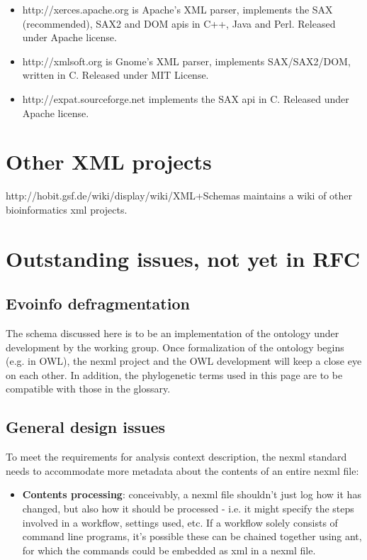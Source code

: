 \documentclass{article}
\begin{document}
\begin{itemize}

\item http://xerces.apache.org is Apache's XML parser, implements the SAX (recommended), SAX2 and DOM apis in C++, Java and Perl. 
Released under Apache license.

\item http://xmlsoft.org is Gnome's XML parser, implements SAX/SAX2/DOM, written in C. Released under MIT License.

\item http://expat.sourceforge.net implements the SAX api in C. Released under Apache license.

\end{itemize}

\section{Other XML projects}
http://hobit.gsf.de/wiki/display/wiki/XML+Schemas maintains a wiki of other bioinformatics xml projects.

\section{Outstanding issues, not yet in RFC}

\subsection{Evoinfo defragmentation}
The schema discussed here is to be an implementation of the ontology under development by the working group. 
Once formalization of the ontology begins (e.g. in OWL), the nexml project and the OWL development will keep a close eye on each 
other. In addition, the phylogenetic terms used in this page are to be compatible with those in the glossary.

\subsection{General design issues}
To meet the requirements for analysis context description, the nexml standard needs to accommodate more metadata 
about the contents of an entire nexml file:

\begin{itemize}

\item \textbf{Contents processing}: conceivably, a nexml file shouldn't just log how it has changed, but also how it should be processed - 
i.e. it might specify the steps involved in a workflow, settings used, etc. If a workflow solely consists of command line programs, 
it's possible these can be chained together using ant, for which the commands could be embedded as xml in a nexml file.

\end{itemize}
\end{document}
